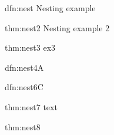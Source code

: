 \documentclass[]{article}
\begin{document}
\begin{dfn}[Definition]{dfn:nest}{}
    Nesting example

    \begin{thm}{thm:nest2}{}
        Nesting example 2

        \begin{thm}[again]{thm:nest3}{}
            ex3
        \end{thm}
    \end{thm}
\end{dfn}

\begin{dfn}[Definition]{dfn:nest4}{A}
\end{dfn}


\begin{dfn}[Definition]{dfn:nest6}{C}
    \begin{thm}{thm:nest7}{}
        text
        \begin{thm}[nested 3]{thm:nest8}{}

        \end{thm}
    \end{thm}
\end{dfn}
\end{document}
